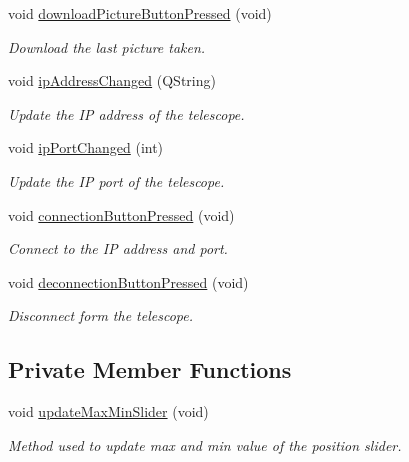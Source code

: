 \begin{DoxyCompactItemize}
void \hyperlink{class_autoscope_window_form_aa9b74f8e713325bc6a1ffbfa2bde4c86}{download\+Picture\+Button\+Pressed} (void)
\begin{DoxyCompactList}\small\item\em Download the last picture taken. \end{DoxyCompactList}\item 
void \hyperlink{class_autoscope_window_form_a80f7209d6d50544e0ff3428929144ab9}{ip\+Address\+Changed} (Q\+String)
\begin{DoxyCompactList}\small\item\em Update the IP address of the telescope. \end{DoxyCompactList}\item 
void \hyperlink{class_autoscope_window_form_a6a97495bdd5b32ffb89c8c282873e214}{ip\+Port\+Changed} (int)
\begin{DoxyCompactList}\small\item\em Update the IP port of the telescope. \end{DoxyCompactList}\item 
void \hyperlink{class_autoscope_window_form_a1ff4464df3990dc363cb186813427a0d}{connection\+Button\+Pressed} (void)
\begin{DoxyCompactList}\small\item\em Connect to the IP address and port. \end{DoxyCompactList}\item 
void \hyperlink{class_autoscope_window_form_ab370615515fd07540aed9fa2afa06522}{deconnection\+Button\+Pressed} (void)
\begin{DoxyCompactList}\small\item\em Disconnect form the telescope. \end{DoxyCompactList}\end{DoxyCompactItemize}
\subsection*{Private Member Functions}
\begin{DoxyCompactItemize}
\item 
void \hyperlink{class_autoscope_window_form_a599b2ec55d4051832dea26cc715265fe}{update\+Max\+Min\+Slider} (void)
\begin{DoxyCompactList}\small\item\em Method used to update max and min value of the position slider. \end{DoxyCompactList}\end{DoxyCompactItemize}
